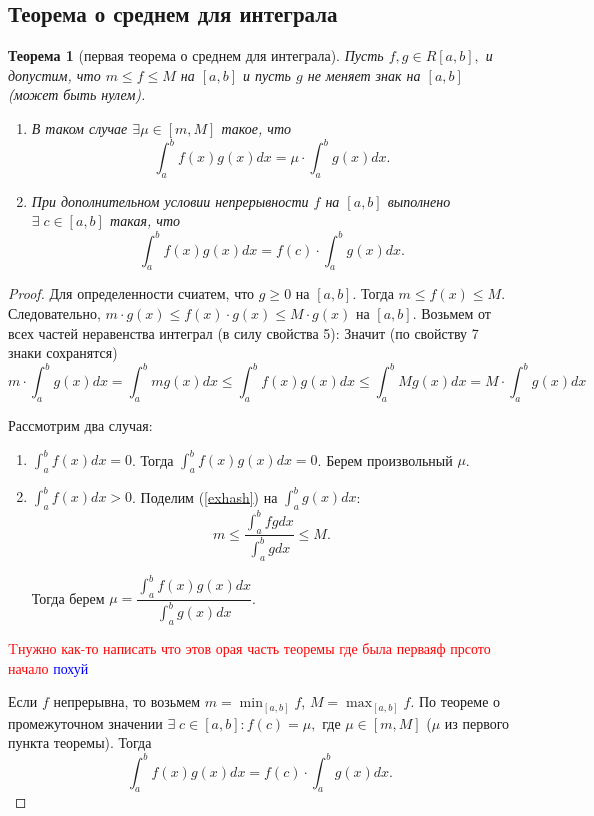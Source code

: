 \documentclass{article}
\theoremstyle{plain}
\newtheorem{theorem}{Теорема}
\theoremstyle{definition}
\theoremstyle{remark}
\renewcommand{\*}{\cdot}
\begin{document}
\subsection{Теорема о среднем для интеграла}
\begin{theorem}[первая теорема о среднем для интеграла]\label{th:intavg1}
Пусть $f, g \in R[a, b],$ и допустим, что $m \leq f \leq M $ на $[a, b]$ и пусть $g$ не меняет знак на $[a, b]$ (может быть нулем). 

\begin{enumerate}
    \item В таком случае $\exists \mu \in [m ,M]$ такое, что
    $$\int_a^b f(x)g(x)dx = \mu \cdot \int_a^b g(x)dx.$$

    \item При дополнительном условии непрерывности $f$ на $[a, b]$ выполнено $\exists\; c \in [a ,b]$ такая, что$$ \int_a^b f(x)g(x)dx = f(c)\cdot \int_a^b g(x)dx.$$
\end{enumerate}
\end{theorem}
\begin{proof}
Для определенности счиатем, что $g\geq 0$ на $[a, b]$. Тогда $m \leq f(x) \leq M $. Следовательно, $m\cdot g(x) \leq f(x)\cdot g(x) \leq M\cdot g(x) $ на $[a, b].$ Возьмем от всех частей неравенства интеграл (в силу свойства 5):
Значит (по свойству 7 знаки сохранятся)
\begin{equation}\label{exhash}
 m \cdot \int_a^b g(x)dx= \int_a^b mg(x)dx \leq \int_a^b f(x)g(x)dx \leq \int_a^b Mg(x)dx = M \cdot \int_a^b g(x)dx   
\end{equation}


Рассмотрим два случая:
\begin{enumerate}
    \item $\int_a^b f(x)dx =0$. Тогда $\int_a^b f(x)g(x)dx =0$. Берем произвольный $\mu$.
    \item $\int_a^b f(x)dx > 0$. Поделим (\ref{exhash}) на $\int_a^b g(x)dx$: 
    \[
    m \leq \frac{\int_a^b fgdx }{\int_a^b g dx} \leq M.
    \] 

    
Тогда берем $\mu = \dfrac{\int_a^b f(x)g(x)dx }{\int_a^b g(x)dx} $.
\end{enumerate}

\textcolor{red}{Tнужно как-то написать что этов орая часть теоремы
где была перваяф прсото
начало}
\textcolor{blue}{похуй}

Если $f$ непрерывна, то возьмем $m = \min_{[a,b]} f$, $M = \max_{[a,b]} f$. По теореме о промежуточном значении $\exists \;c \in [a, b]: f(c) = \mu,$ где $\mu \in [m, M]$ ($\mu$ из первого пункта теоремы). Тогда $$ \int_a^b f(x)g(x)dx = f(c)\cdot \int_a^b g(x)dx.$$
\end{proof}
\end{document}
